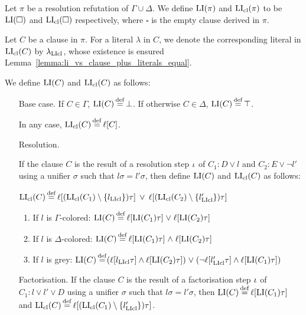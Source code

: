 \documentclass[,%
	draft=false,%
	numbers=noendperiod
	11pt,
	a4paper,
	oneside,%
	openany,
]{memoir}
\begin{document}
\begin{defi}
	Let $\pi$ be a resolution refutation of $\Gamma \cup \Delta$.
	We define $\operatorname{LI}(\pi)$ and $\operatorname{LI}_{\operatorname{cl}}(\pi)$ to be $\operatorname{LI}(\square)$ and $\operatorname{LI}_{\operatorname{cl}}(\square)$ respectively, where $\square$ is the empty clause derived in $\pi$.

	Let $C$ be a clause in $\pi$. 
	For a literal $\lambda$ in $C$, we denote the corresponding literal in $\operatorname{LI}_{\operatorname{cl}}(C)$ by $\lambda_{\operatorname{LIcl}}$, whose existence is ensured Lemma~\ref{lemma:li_vs_clause_plus_literals_equal}.

	We define $\operatorname{LI}(C)$ and $\operatorname{LI}_{\operatorname{cl}}(C)$ as follows:

	\begin{itemize}
		\item[Base case.]
			If $C \in \Gamma$, $\operatorname{LI}(C) \operatorname{\stackrel{\mathrm{def}}{=}} \bot$.
			If otherwise $C \in \Delta$, $\operatorname{LI}(C) \operatorname{\stackrel{\mathrm{def}}{=}} \top$.

			In any case, $\operatorname{LI}_{\operatorname{cl}}(C) \operatorname{\stackrel{\mathrm{def}}{=}} \ell[C]$.
		\item[Resolution.]

			If the clause $C$ is the result of a resolution step $\iota$ of $C_1: D \lor l$ and $C_2: E \lor \lnot l'$ using a unifier $\sigma$ such that $l\sigma =  l'\sigma$, then define $\operatorname{LI}(C)$ and $\operatorname{LI}_{\operatorname{cl}}(C)$ as follows:

			$\operatorname{LI}_{\operatorname{cl}}(C) \operatorname{\stackrel{\mathrm{def}}{=}} \ell[(\operatorname{LI}_{\operatorname{cl}}(C_1) \setminus \{l_{\operatorname{LIcl}}\})\tau] \;\,{\lor}\;\, \ell[(\operatorname{LI}_{\operatorname{cl}}(C_2)\setminus \{l_{\operatorname{LIcl}}'\})\tau] $

			\begin{enumerate}

				\item If $l$ is $\Gamma$-colored:
					$\operatorname{LI}(C) \operatorname{\stackrel{\mathrm{def}}{=}} \ell[\operatorname{LI}(C_1)\tau]\;{\lor}\; \ell[\operatorname{LI}(C_2)\tau] $

				\item If $l$ is $\Delta$-colored:
					$\operatorname{LI}(C) \operatorname{\stackrel{\mathrm{def}}{=}} \ell[\operatorname{LI}(C_1)\tau]\;{\land}\; \ell[\operatorname{LI}(C_2)\tau] $

				\item If $l$ is grey:
					$\operatorname{LI}(C) \operatorname{\stackrel{\mathrm{def}}{=}}
					(\ell[l_{\operatorname{LIcl}}\tau] \land \ell[\operatorname{LI}(C_2)\tau]) \;{\lor}\;
					(\lnot \ell[l'_{\operatorname{LIcl}}\tau]\land \ell[\operatorname{LI}(C_1)\tau ])
					$

			\end{enumerate}

		\item[Factorisation.]
			If the clause $C$ is the result of a factorisation step $\iota$ of $C_1: l \lor l' \lor D$ using a unifier $\sigma$ such that $l\sigma = l'\sigma$, then $\operatorname{LI}(C) \operatorname{\stackrel{\mathrm{def}}{=}} \ell[\operatorname{LI}(C_1)\tau]$ and $\lifiboth{C} \defeq \lifboth{ (\lifiboth{C_1} \setminus\nolinebreak \{l'\cll\})\tau}$.
			\qedhere

	\end{itemize}

\end{defi}
\end{document}
